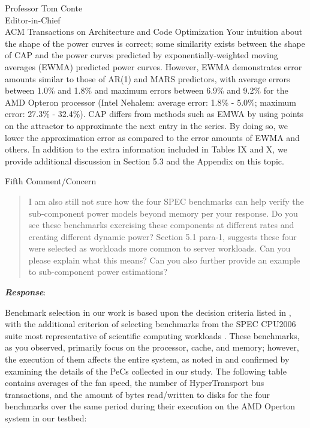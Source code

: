 \documentclass[10pt]{letter} %
\newenvironment{rviewcomment}
{~\\%
\begin{bfseries}}
{\end{bfseries}}
\newcommand{\rviewresponse}{\textbf{\textit{Response}}:}
\begin{document}
\begin{letter}{Professor Tom Conte \\
Editor-in-Chief \\
ACM Transactions on Architecture and Code Optimization }
Your intuition about the shape of the power curves is correct; some
similarity exists between the shape of CAP and the power curves
predicted by exponentially-weighted moving averages (EWMA) predicted
power curves.  However, EWMA demonstrates error amounts similar to those
of AR(1) and MARS predictors, with average errors between 1.0\% and
1.8\% and maximum errors between 6.9\% and 9.2\% for the AMD Opteron
processor (Intel Nehalem: average error: 1.8\% - 5.0\%; maximum error:
27.3\% - 32.4\%). CAP differs from methods such as EMWA by using points
on the attractor to approximate the next entry in the series.  By doing
so, we lower the approximation error as compared to the error amounts of
EWMA and others.  In addition
to the extra information included in Tables IX and X, we provide
additional discussion in Section 5.3 and the Appendix on this topic.
\newpage
\begin{rviewcomment}
  Fifth Comment/Concern
\end{rviewcomment}
\begin{quote}
  \begin{itshape}
    I am also still not sure how the four SPEC benchmarks can help
    verify the sub-component power models beyond memory per your
    response. Do you see these benchmarks exercising these components at
    different rates and creating different dynamic power? Section 5.1
    para-1, suggests these four were selected as workloads more common
    to server workloads. Can you please explain what this means? Can you
    also further provide an example to sub-component power estimations?
  \end{itshape}
\end{quote}
\rviewresponse

Benchmark selection in our work is based upon the decision criteria
listed in \cite{Phansalkar2007}, with the additional criterion of
selecting benchmarks from the SPEC CPU2006 suite most representative of
scientific computing workloads \cite{Cisco2010}.  These benchmarks, as
you observed, primarily focus on the processor, cache, and memory;
however, the execution of them affects the entire system, as noted in
\cite{Ye2007} and confirmed by examining the details of the PeCs
collected in our study.  The following table contains averages of the
fan speed, the number of HyperTransport bus transactions, and the amount
of bytes read/written to disks for the four benchmarks over the same
period during their execution on the AMD Operton system in our testbed:


\end{letter}
\end{document}
